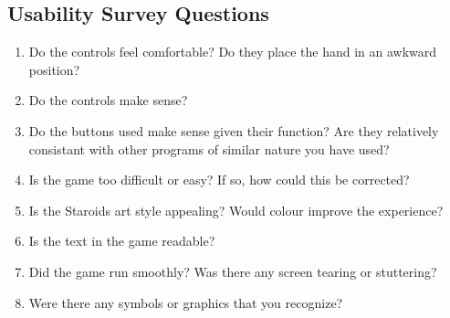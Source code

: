 \documentclass[12pt, titlepage]{article}
\begin{document}
\subsection{Usability Survey Questions}
\label{interview:questions}

\begin{enumerate}
  
  \item Do the controls feel comfortable? Do they place the hand in an awkward position?
  \item Do the controls make sense?
  \item Do the buttons used make sense given their function? Are they relatively consistant with other programs of similar nature you have used?
  \item Is the game too difficult or easy? If so, how could this be corrected?
  \item Is the Staroids art style appealing? Would colour improve the experience?
  \item Is the text in the game readable?
  \item Did the game run smoothly? Was there any screen tearing or stuttering?
  \item Were there any symbols or graphics that you recognize?
  
\end{enumerate}
\end{document}
